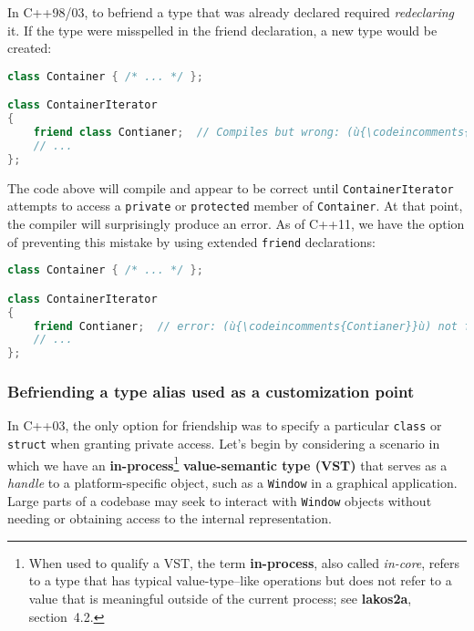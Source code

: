 In C++98/03, to befriend a type that was already declared required
\emph{redeclaring} it. If the type were misspelled in the friend
declaration, a new type would be created:

\begin{lstlisting}[language=C++]
class Container { /* ... */ };

class ContainerIterator
{
    friend class Contianer;  // Compiles but wrong: (ù{\codeincomments{ia}}ù) should have been (ù{\codeincomments{ai}}ù).
    // ...
};
\end{lstlisting}

\noindent The code above will compile and appear to be correct until
\texttt{ContainerIterator} attempts to access a \texttt{private} or
\texttt{protected} member of \texttt{Container}. At that point, the
compiler will surprisingly produce an error. As of C++11, we have the
option of preventing this mistake by using extended \texttt{friend}
declarations:

\begin{lstlisting}[language=C++]
class Container { /* ... */ };

class ContainerIterator
{
    friend Contianer;  // error: (ù{\codeincomments{Contianer}}ù) not found
    // ...
};
\end{lstlisting}


\subsubsection[Befriending a type alias used as a customization point]{Befriending a type alias used as a customization point}\label{befriending-a-type-alias-used-as-a-customization-point}

In C++03, the only option for friendship was to specify a particular
\texttt{class} or \texttt{struct} when granting private access. Let's
begin by considering a scenario in which we have an
\textbf{in-process}{\cprotect\footnote{When used to qualify a VST, the
term \textbf{in-process}, also called \emph{in-core}, refers to a type
that has typical value-type--like operations but does not refer to a
value that is meaningful outside of the current process; see
  \textbf{lakos2a}, section~4.2.}} \textbf{value-semantic type (VST)}
that serves as a \emph{handle} to a platform-specific object, such as a
\texttt{Window} in a graphical application. Large parts of a codebase
may seek to interact with \texttt{Window} objects without needing or
obtaining access to the internal representation.

